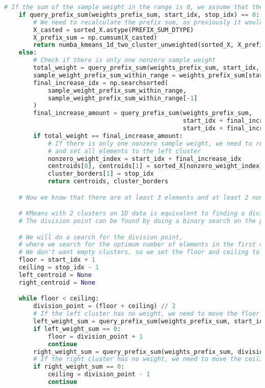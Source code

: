 \begin{lstlisting}[language=Python]
    # If the sum of the sample weight in the range is 0, we assume that the data is unweighted
    if query_prefix_sum(weights_prefix_sum, start_idx, stop_idx) == 0:
        # We need to recalculate the prefix sum, as previously it would have been all zeros
        X_casted = sorted_X.astype(PREFIX_SUM_DTYPE)
        X_prefix_sum = np.cumsum(X_casted)
        return numba_kmeans_1d_two_cluster_unweighted(sorted_X, X_prefix_sum, start_idx, stop_idx)
    else:
        # Check if there is only one nonzero sample weight
        total_weight = query_prefix_sum(weights_prefix_sum, start_idx, stop_idx)
        sample_weight_prefix_sum_within_range = weights_prefix_sum[start_idx:stop_idx]
        final_increase_idx = np.searchsorted(
            sample_weight_prefix_sum_within_range,
            sample_weight_prefix_sum_within_range[-1]
        )
        final_increase_amount = query_prefix_sum(weights_prefix_sum,
                                                 start_idx + final_increase_idx,
                                                 start_idx + final_increase_idx + 1)
        if total_weight == final_increase_amount:
            # If there is only one nonzero sample weight, we need to return the corresponding weight as the centroid
            # and set all elements to the left cluster
            nonzero_weight_index = start_idx + final_increase_idx
            centroids[0], centroids[1] = sorted_X[nonzero_weight_index], sorted_X[nonzero_weight_index]
            cluster_borders[1] = stop_idx
            return centroids, cluster_borders

    # Now we know that there are at least 3 elements and at least 2 nonzero weights

    # KMeans with 2 clusters on 1D data is equivalent to finding a division point.
    # The division point can be found by doing a binary search on the prefix sum.

    # We will do a search for the division point,
    # where we search for the optimum number of elements in the first cluster
    # We don't want empty clusters, so we set the floor and ceiling to start_idx + 1 and stop_idx - 1
    floor = start_idx + 1
    ceiling = stop_idx - 1
    left_centroid = None
    right_centroid = None

    while floor < ceiling:
        division_point = (floor + ceiling) // 2
        # If the left cluster has no weight, we need to move the floor up
        left_weight_sum = query_prefix_sum(weights_prefix_sum, start_idx, division_point)
        if left_weight_sum == 0:
            floor = division_point + 1
            continue
        right_weight_sum = query_prefix_sum(weights_prefix_sum, division_point, stop_idx)
        # If the right cluster has no weight, we need to move the ceiling down
        if right_weight_sum == 0:
            ceiling = division_point - 1
            continue


\end{lstlisting}
